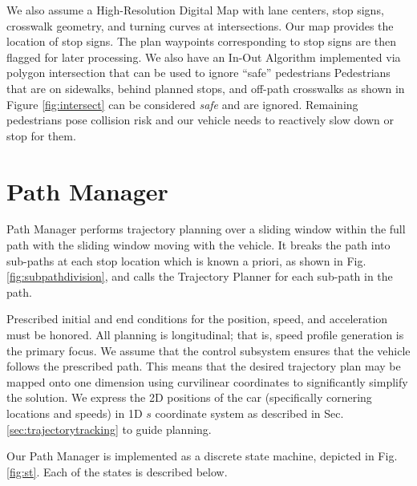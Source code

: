 \documentclass[letterpaper, 10 pt, conference]{ieeeconf}  %
\begin{document}
We also assume a High-Resolution Digital Map with lane centers, stop signs, crosswalk geometry, and turning curves at intersections.
Our map provides the location of stop signs.
The plan waypoints corresponding to stop signs are then flagged for later processing.
We also have an In-Out Algorithm implemented via polygon intersection that can be used to ignore “safe” pedestrians
Pedestrians that are on sidewalks, behind planned stops, and off-path crosswalks as shown in Figure \ref{fig:intersect} can be considered {\it safe} and are ignored.
Remaining pedestrians pose collision risk and our vehicle needs to reactively slow down or stop for them.



\section{Path Manager} \label{sec:pathmanager}


Path Manager performs trajectory planning over a sliding window within the full path with the sliding window moving with the vehicle.
It breaks the path into sub-paths at each stop location which is known a priori, as shown in Fig. \ref{fig:subpathdivision}, and calls the Trajectory Planner for each sub-path in the path.

Prescribed initial and end conditions for the position, speed, and acceleration must be honored.
All planning is longitudinal; that is, speed profile generation is the primary focus. We assume that the control subsystem ensures that the vehicle follows the prescribed path.
This means that the desired trajectory plan may be mapped onto one dimension using curvilinear coordinates to significantly simplify the solution.
We express the 2D positions of the car (specifically cornering locations and speeds) in 1D $s$ coordinate system as described in Sec. \ref{sec:trajectorytracking} to guide planning.

Our Path Manager is implemented as a discrete state machine, depicted in Fig. \ref{fig:st}.
Each of the states is described below.
\end{document}
